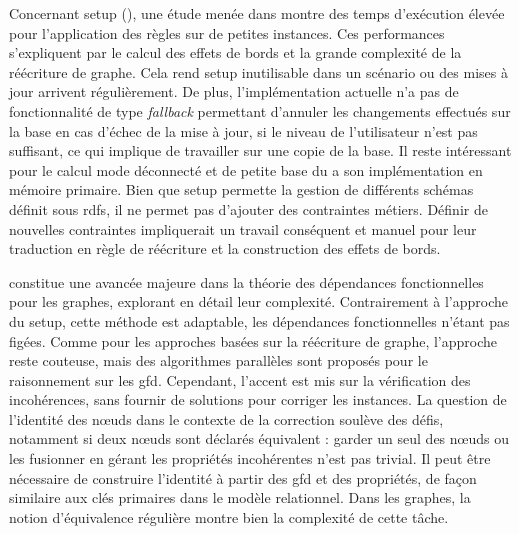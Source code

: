 Concernant \gls{setup} (\cite{chabinUsingGraphGrammar2019}), une étude menée dans \cite{chabinGraphRewritingSystem2020,chabinGraphRewritingRules2021} montre des temps d'exécution élevée pour l'application des règles sur de petites instances.
Ces performances s'expliquent par le calcul des effets de bords et la grande complexité de la réécriture de graphe.
Cela rend \gls{setup} inutilisable dans un scénario ou des mises à jour arrivent régulièrement.
De plus, l'implémentation actuelle n'a pas de fonctionnalité de type \emph{fallback} permettant d'annuler les changements effectués sur la base en cas d'échec de la mise à jour, si le niveau de l'utilisateur n'est pas suffisant, ce qui implique de travailler sur une copie de la base.
Il reste intéressant pour le calcul mode déconnecté et de petite base du a son implémentation en mémoire primaire.
Bien que \gls{setup} permette la gestion de différents schémas définit sous \gls{rdfs}, il ne permet pas d'ajouter des contraintes métiers.
Définir de nouvelles contraintes impliquerait un travail conséquent et manuel pour leur traduction en règle de réécriture et la construction des effets de bords.

\cite{fanDependenciesGraphs2019} constitue une avancée majeure dans la théorie des dépendances fonctionnelles pour les graphes, explorant en détail leur complexité.
Contrairement à l'approche du \gls{setup}, cette méthode est adaptable, les dépendances fonctionnelles n'étant pas figées.
Comme pour les approches basées sur la réécriture de graphe, l'approche reste couteuse, mais des algorithmes parallèles sont proposés pour le raisonnement sur les \gls{gfd}.
Cependant, l'accent est mis sur la vérification des incohérences, sans fournir de solutions pour corriger les instances.
La question de l'identité des nœuds dans le contexte de la correction soulève des défis, notamment si deux nœuds sont déclarés équivalent : garder un seul des nœuds ou les fusionner en gérant les propriétés incohérentes n'est pas trivial.
Il peut être nécessaire de construire l'identité à partir des \gls{gfd} et des propriétés, de façon similaire aux clés primaires dans le modèle relationnel.
Dans les graphes, la notion d'équivalence régulière \cite{everettRegularEquivalenceGeneral1994} montre bien la complexité de cette tâche.

